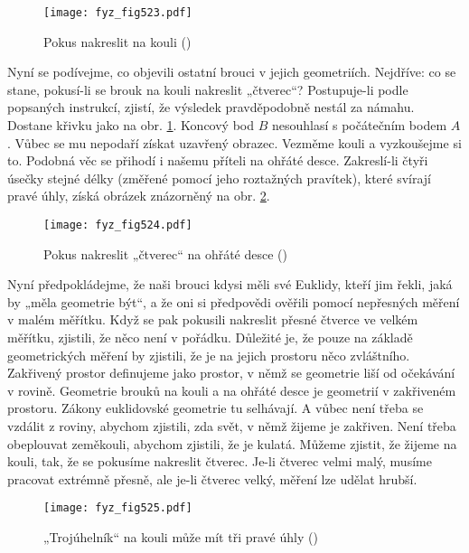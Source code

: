 {    \begin{figure}[ht!] %
      \centering
      \texttt{[image: fyz\_fig523.pdf]}
      \caption{Pokus nakreslit  na kouli
               (\cite[s.~777]{Feynman02})}
      \label{fyz:fig523}
    \end{figure}

    Nyní se podívejme, co objevili ostatní brouci v jejich geometriích. Nejdříve: co se stane, 
    pokusí-li se brouk na kouli nakreslit „čtverec“? Postupuje-li podle popsaných instrukcí, 
    zjistí, že výsledek pravděpodobně nestál za námahu. Dostane křivku jako na obr. 
    \ref{fyz:fig523}. Koncový bod \(B\) nesouhlasí s počátečním bodem \(A\). Vůbec se mu nepodaří 
    získat uzavřený obrazec. Vezměme kouli a vyzkoušejme si to. Podobná věc se přihodí i našemu 
    příteli na ohřáté desce. Zakreslí-li čtyři úsečky stejné délky (změřené pomocí jeho roztažných 
    pravítek), které svírají pravé úhly, získá obrázek znázorněný na obr. \ref{fyz:fig524}.

    \begin{figure}[ht!] %
      \centering
      \texttt{[image: fyz\_fig524.pdf]}
      \caption{Pokus nakreslit „čtverec“ na ohřáté desce
               (\cite[s.~778]{Feynman02})}
      \label{fyz:fig524}
    \end{figure}
   
    Nyní předpokládejme, že naši brouci kdysi měli své Euklidy, kteří jim řekli, jaká by „měla 
    geometrie být“, a že oni si předpovědi ověřili pomocí nepřesných měření v malém měřítku. Když 
    se pak pokusili nakreslit přesné čtverce ve velkém měřítku, zjistili, že něco není v pořádku. 
    Důležité je, že pouze na základě geometrických měření by zjistili, že je na jejich prostoru 
    něco zvláštního. Zakřivený prostor definujeme jako prostor, v němž se geometrie liší od 
    očekávání v rovině. Geometrie brouků na kouli a na ohřáté desce je geometrií v zakřiveném 
    prostoru. Zákony euklidovské geometrie tu selhávají. A vůbec není třeba se vzdálit z roviny, 
    abychom zjistili, zda svět, v němž žijeme je zakřiven. Není třeba obeplouvat zeměkouli, abychom 
    zjistili, že je kulatá. Můžeme zjistit, že žijeme na kouli, tak, že se pokusíme nakreslit 
    čtverec. Je-li čtverec velmi malý, musíme pracovat extrémně přesně, ale je-li čtverec velký, 
    měření lze udělat hrubší.

    \begin{figure}[ht!] %
      \centering
      \texttt{[image: fyz\_fig525.pdf]}
      \caption{„Trojúhelník“ na kouli může mít tři pravé úhly
               (\cite[s.~778]{Feynman02})}
      \label{fyz:fig525}
    \end{figure}
    
}
